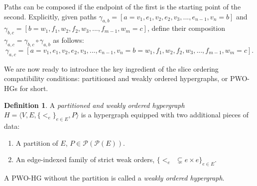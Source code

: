 \documentclass{article}
\theoremstyle{plain}
\theoremstyle{definition}
\newtheorem{definition}[theorem]{Definition}
\theoremstyle{remark}
\begin{document}
Paths can be composed if the endpoint of the first is the starting point of the second. Explicitly, given paths $\gamma_{a,b} = [a = v_1, e_1, v_2, e_2, v_3, ...,  e_{n-1}, v_n = b]$ and $\gamma_{b,c} = [b = w_1, f_1, w_2, f_2, w_3, ...,  f_{m-1}, w_m = c]$, define their composition $\gamma_{a,c} = \gamma_{b, c} \circ \gamma_{a,b}$ as follows:
\begin{equation*}
	\gamma_{a,c} = [a = v_1, e_1, v_2, e_2, v_3, ...,  e_{n-1}, v_n = b = w_1, f_1, w_2, f_2, w_3, ..., f_{m-1}, w_m = c].
\end{equation*}

We are now ready to introduce the key ingredient of the slice ordering compatibility conditions: partitioned and weakly ordered hypergraphs, or PWO-HGs for short.
\begin{definition}
	A \textit{partitioned and weakly ordered hypergraph} $H = \big\langle V, E, \{<_e\}_{e \in E}, P \big\rangle$ is a hypergraph equipped with two additional pieces of data:
	\begin{enumerate}
		\item A partition of $E$, $P \in \mathcal{P}(\mathcal{P}(E))$.
		\item An edge-indexed family of strict weak orders, $\big\{<_e \ \ \subsetneq e \times e\big\}_{e \in E}$.
	\end{enumerate}
	\label{def:PWOHGs}
\end{definition}
A PWO-HG without the partition is called a \textit{weakly ordered hypergraph}.
\end{document}
